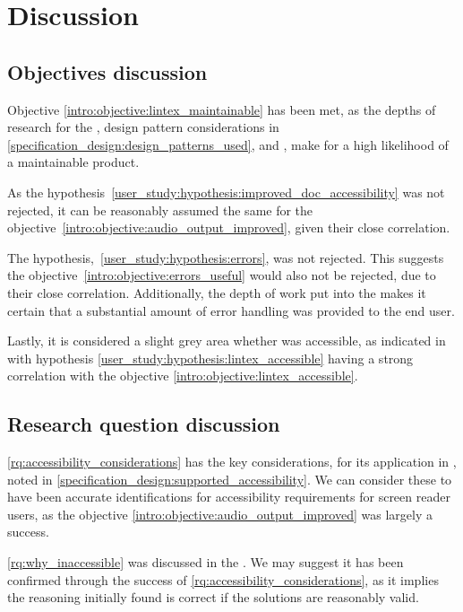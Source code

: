 \section{Discussion}\label{discuss_reflect}
\subsection{Objectives discussion}
Objective \ref{intro:objective:lintex_maintainable} has been met, as the depths of research for the , design pattern considerations in \cref{specification_design:design_patterns_used}, and , make for a high likelihood of a maintainable product.

As the hypothesis~\ref{user_study:hypothesis:improved_doc_accessibility} was not rejected, it can be reasonably assumed the same for the objective~\ref{intro:objective:audio_output_improved}, given their close correlation.

The hypothesis,~\ref{user_study:hypothesis:errors}, was not rejected. This suggests the objective~\ref{intro:objective:errors_useful} would also not be rejected, due to their close correlation. Additionally, the depth of work put into the  makes it certain that a substantial amount of error handling was provided to the end user.

Lastly, it is considered a slight grey area whether \lintexspaced was accessible, as indicated in  with hypothesis \ref{user_study:hypothesis:lintex_accessible} having a strong correlation with the objective \ref{intro:objective:lintex_accessible}.

\subsection{Research question discussion}
\ref{rq:accessibility_considerations} has the key considerations, for its application in \latex, noted in \cref{specification_design:supported_accessibility}. We can consider these to have been accurate identifications for \latexspaced accessibility requirements for screen reader users, as the objective \ref{intro:objective:audio_output_improved} was largely a success.

\ref{rq:why_inaccessible} was discussed in the . We may suggest it has been confirmed through the success of \ref{rq:accessibility_considerations}, as it implies the reasoning initially found is correct if the solutions are reasonably valid.